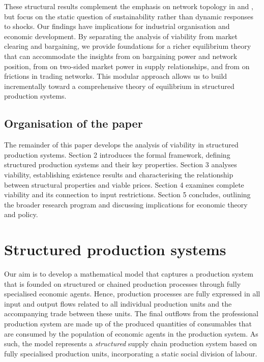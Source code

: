 \documentclass[11pt,fleqn]{article}
\begin{document}
These structural results complement the emphasis on network topology in \citet{Baqaee2018} and \citet{Baqaee2019}, but focus on the static question of sustainability rather than dynamic responses to shocks. Our findings have implications for industrial organisation and economic development. By separating the analysis of viability from market clearing and bargaining, we provide foundations for a richer equilibrium theory that can accommodate the insights from \citet{Siedlarek2025} on bargaining power and network position, from \citet{Alviarez2026} on two-sided market power in supply relationships, and from \citet{Fleiner2019} on frictions in trading networks. This modular approach allows us to build incrementally toward a comprehensive theory of equilibrium in structured production systems.

\subsection{Organisation of the paper}

The remainder of this paper develops the analysis of viability in structured production systems. Section 2 introduces the formal framework, defining structured production systems and their key properties. Section 3 analyses viability, establishing existence results and characterising the relationship between structural properties and viable prices. Section 4 examines complete viability and its connection to input restrictions. Section 5 concludes, outlining the broader research program and discussing implications for economic theory and policy.


\section{Structured production systems}

Our aim is to develop a mathematical model that captures a production system that is founded on structured or chained production processes through fully specialised economic agents.  Hence, production processes are fully expressed in all input and output flows related to all individual production units and the accompanying trade between these units. The final outflows from the professional production system are made up of the produced quantities of consumables that are consumed by the population of economic agents in the production system. As such, the model represents a \emph{structured} supply chain production system based on fully specialised production units, incorporating a static social division of labour.
\end{document}
